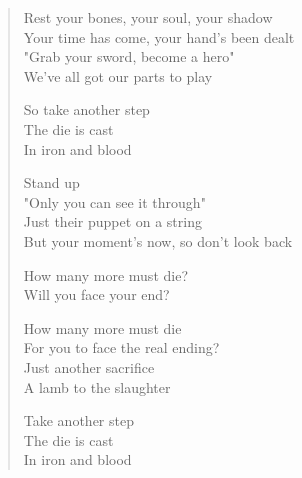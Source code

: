 
\setlength{\parskip}{1\baselineskip}

\begin{verse}
Rest your bones, your soul, your shadow \\
Your time has come, your hand's been dealt \\
"Grab your sword, become a hero" \\
We've all got our parts to play

So take another step \\
The die is cast \\
In iron and blood

Stand up \\
"Only you can see it through" \\
Just their puppet on a string \\
But your moment's now, so don't look back

How many more must die? \\
Will you face your end?

How many more must die \\
For you to face the real ending? \\
Just another sacrifice \\
A lamb to the slaughter

Take another step \\
The die is cast \\
In iron and blood
\end{verse}

